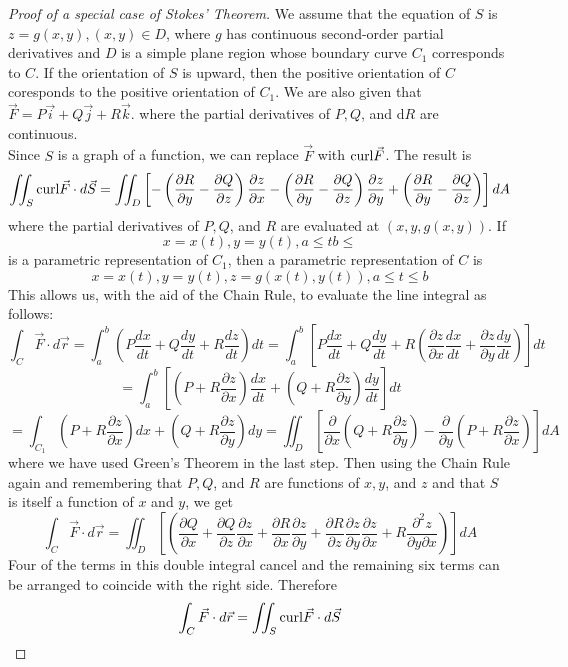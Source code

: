 \documentclass[10pt]{report}
\newcommand{\curl}{\textup{curl}}
\begin{document}
\begin{proof}[Proof of a special case of Stokes' Theorem]
We assume that the equation of $S$ is $z=g(x,y), (x,y)\in D$, where $g$ has continuous second-order partial derivatives and $D$ is a simple plane region whose boundary curve $C_1$ corresponds to $C$. If the orientation of $S$ is upward, then the positive orientation of $C$ coresponds to the positive orientation of $C_1$. We are also given that $\vec{F} = P\vec{i} + Q\vec{j} + R\vec{k}$. where the partial derivatives of $P, Q$, and d$R$ are continuous.\\ Since $S$ is a graph of a function, we can replace $\vec{F}$ with $\curl\vec{F}$. The result is
$$\iint_S\curl\vec{F}\cdot d\vec{S} = \iint_D\left[ -\left( \frac{\partial R}{\partial y} - \frac{\partial Q}{\partial z}\right)\frac{\partial z}{\partial x}-\left( \frac{\partial R}{\partial y} - \frac{\partial Q}{\partial z}\right)\frac{\partial z}{\partial y}+\left( \frac{\partial R}{\partial y} - \frac{\partial Q}{\partial z}\right)\right]dA$$
where the partial derivatives of $P, Q$, and $R$ are evaluated at $(x,y,g(x,y))$. If 
$$x=x(t), y=y(t), a\leq t b\leq$$
is a parametric representation of $C_1$, then a parametric representation of $C$ is 
$$x=x(t), y=y(t), z=g(x(t),y(t)), a\leq t \leq b$$
This allows us, with the aid of the Chain Rule, to evaluate the line integral as follows:
$$\int_C\vec{F}\cdot d\vec{r} = \int_a^b\left( P\frac{dx}{dt} + Q\frac{dy}{dt} + R\frac{dz}{dt}\right)dt = \int_a^b\left[ P\frac{dx}{dt}+Q\frac{dy}{dt} + R\left(\frac{\partial z}{\partial x}\frac{dx}{dt} + \frac{\partial z}{\partial y}\frac{dy}{dt}\right)\right]dt$$
$$=\int_a^b\left[\left(P+R\frac{\partial z}{\partial x}\right)\frac{dx}{dt}+\left(Q + R\frac{\partial z}{\partial y}\right)\frac{dy}{dt}\right]dt$$
$$=\int_{C_1}\left(P+R\frac{\partial z}{\partial x}\right)dx + \left( Q+R\frac{\partial z}{\partial y}\right)dy = \iint_D\left[\frac{\partial}{\partial x}\left( Q+R\frac{\partial z}{\partial y}\right) - \frac{\partial}{\partial y}\left( P+R\frac{\partial z}{\partial x}\right)\right]dA$$
where we have used Green's Theorem in the last step. Then using the Chain Rule again and remembering that $P,Q$, and $R$ are functions of $x,y$, and $z$ and that $S$ is itself a function of $x$ and $y$, we get
$$\int_C\vec{F}\cdot d\vec{r} = \iint_D\left[\left(\frac{\partial Q}{\partial x} + \frac{\partial Q}{\partial z}\frac{\partial z}{\partial x} + \frac{\partial R}{\partial x}\frac{\partial z}{\partial y} +\frac{\partial R}{\partial z}\frac{\partial z}{\partial y}\frac{\partial z}{\partial x} + R\frac{\partial ^2z}{\partial y\partial x}\right)\right] dA$$
Four of the terms in this double integral cancel and the remaining six terms can be arranged to coincide with the right side. Therefore
$$\int_C\vec{F}\cdot d\vec{r} = \iint_S\curl\vec{F}\cdot d\vec{S}$$
\end{proof}
\end{document}
